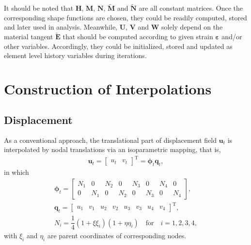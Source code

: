 \documentclass[3p,sort&compress,review,11pt]{elsarticle}
\newcommand*{\mT}{\mathrm{T}}
\begin{document}
It should be noted that $\mathbold{H}$, $\mathbold{M}$, $\mathbold{N}$, $\tilde{\mathbold{M}}$ and $\tilde{\mathbold{N}}$ are all constant matrices. Once the corresponding shape functions are chosen, they could be readily computed, stored and later used in analysis. Meanwhile, $\mathbold{U}$, $\mathbold{V}$ and $\mathbold{W}$ solely depend on the material tangent $\tilde{\mathbold{E}}$ that should be computed according to given strain $\mathbold{\varepsilon}$ and/or other variables. Accordingly, they could be initialized, stored and updated as element level history variables during iterations.
\section{Construction of Interpolations}
\subsection{Displacement}
As a conventional approach, the translational part of displacement field $\mathbold{u}_t$ is interpolated by nodal translations via an isoparametric mapping, that is,
\begin{gather}
\mathbold{u}_t=\begin{bmatrix}u_t&v_t\end{bmatrix}^\mT=\mathbold{\phi}_t\mathbold{q}_t,
\end{gather}
in which
\begin{gather*}
\mathbold{\phi}_t=\begin{bmatrix}
N_1&0&N_2&0&N_3&0&N_4&0\\
0&N_1&0&N_2&0&N_3&0&N_4
\end{bmatrix},\\
\mathbold{q}_t=\begin{bmatrix}
u_1&v_1&u_2&v_2&u_3&v_3&u_4&v_4
\end{bmatrix}^\mT,\\
N_i=\dfrac{1}{4}\left(1+\xi\xi_i\right)\left(1+\eta\eta_i\right)\quad\text{for}\quad{}i=1,2,3,4,
\end{gather*}
with $\xi_i$ and $\eta_i$ are parent coordinates of corresponding nodes.
\end{document}
